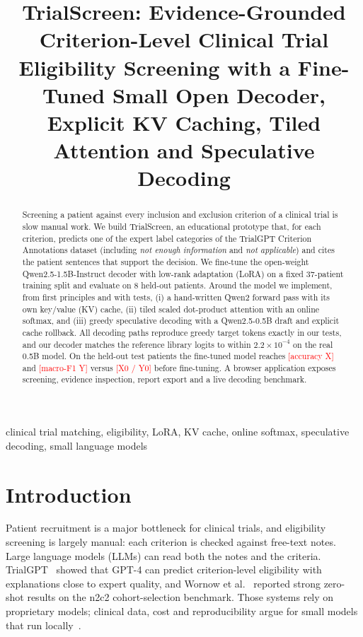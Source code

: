 \documentclass[conference]{IEEEtran}
\newcommand{\fillin}[1]{\textcolor{red}{[#1]}}
\begin{document}
\title{TrialScreen: Evidence-Grounded Criterion-Level Clinical Trial Eligibility Screening with a Fine-Tuned Small Open Decoder, Explicit KV Caching, Tiled Attention and Speculative Decoding}

\author{\IEEEauthorblockN{\fillin{Your Name}}
\IEEEauthorblockA{\fillin{Roll No.}, Department of Computer Science\\
\fillin{University}, \fillin{email}}}

\maketitle

\begin{abstract}
Screening a patient against every inclusion and exclusion criterion of a clinical trial is slow manual work. We build TrialScreen, an educational prototype that, for each criterion, predicts one of the expert label categories of the TrialGPT Criterion Annotations dataset (including \emph{not enough information} and \emph{not applicable}) and cites the patient sentences that support the decision. We fine-tune the open-weight Qwen2.5-1.5B-Instruct decoder with low-rank adaptation (LoRA) on a fixed 37-patient training split and evaluate on 8 held-out patients. Around the model we implement, from first principles and with tests, (i) a hand-written Qwen2 forward pass with its own key/value (KV) cache, (ii) tiled scaled dot-product attention with an online softmax, and (iii) greedy speculative decoding with a Qwen2.5-0.5B draft and explicit cache rollback. All decoding paths reproduce greedy target tokens exactly in our tests, and our decoder matches the reference library logits to within $2.2\times10^{-4}$ on the real 0.5B model. On the held-out test patients the fine-tuned model reaches \fillin{accuracy X} and \fillin{macro-F1 Y} versus \fillin{X0 / Y0} before fine-tuning. A browser application exposes screening, evidence inspection, report export and a live decoding benchmark.
\end{abstract}

\begin{IEEEkeywords}
clinical trial matching, eligibility, LoRA, KV cache, online softmax, speculative decoding, small language models
\end{IEEEkeywords}

\section{Introduction}
Patient recruitment is a major bottleneck for clinical trials, and eligibility screening is largely manual: each criterion is checked against free-text notes. Large language models (LLMs) can read both the notes and the criteria. TrialGPT~\cite{jin2024trialgpt} showed that GPT-4 can predict criterion-level eligibility with explanations close to expert quality, and Wornow et al.~\cite{wornow2024zeroshot} reported strong zero-shot results on the n2c2 cohort-selection benchmark. Those systems rely on proprietary models; clinical data, cost and reproducibility argue for small models that run locally~\cite{nievas2024distilling}.
\end{document}
